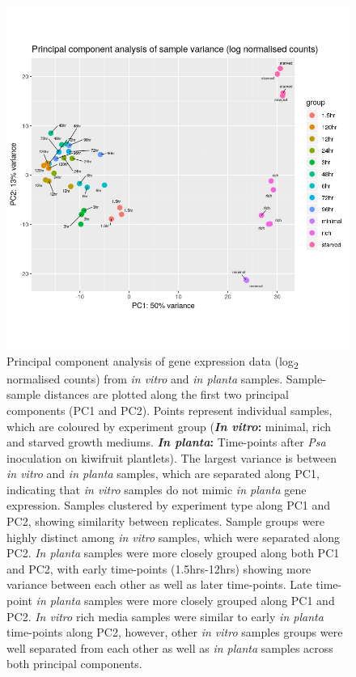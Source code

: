 \begin{figure}[H]
    \centering
    \includegraphics[scale=0.9]{psa/PCA_in_planta.png}
    \caption[PCA plot of \textit{in vitro} and \textit{in planta} samples]{Principal component analysis of gene expression data (log\textsubscript{2} normalised counts) from \textit{in vitro} and \textit{in planta} samples. Sample-sample distances are plotted along the first two principal components (PC1 and PC2). Points represent individual samples, which are coloured by experiment group (\textbf{\textit{In vitro}:} minimal, rich and starved growth mediums. \textbf{\textit{In planta}:} Time-points after \textit{Psa} inoculation on kiwifruit plantlets). The largest variance is between \textit{in vitro} and \textit{in planta} samples, which are separated along PC1, indicating that \textit{in vitro} samples do not mimic \textit{in planta} gene expression. Samples clustered by experiment type along PC1 and PC2, showing similarity between replicates. Sample groups were highly distinct among \textit{in vitro} samples, which were separated along PC2. \textit{In planta} samples were more closely grouped along both PC1 and PC2, with early time-points (1.5hrs-12hrs) showing more variance between each other as well as later time-points. Late time-point \textit{in planta} samples were more closely grouped along PC1 and PC2. \textit{In vitro} rich media samples were similar to early \textit{in planta} time-points along PC2, however, other \textit{in vitro} samples groups were well separated from each other as well as \textit{in planta} samples across both principal components.}
    \label{fig:PCA_in_planta}
\end{figure}

